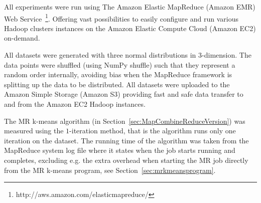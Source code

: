 All experiments were run using The Amazon Elastic MapReduce (Amazon EMR) Web Service~\footnote{http://aws.amazon.com/elasticmapreduce/}. Offering vast possibilities to easily configure and run various Hadoop clusters instances on the Amazon Elastic Compute Cloud (Amazon EC2) on-demand. 

All datasets were generated with three normal distributions in $3$-dimension. The data points were shuffled (using NumPy shuffle) such that they represent a random order internally, avoiding bias when the MapReduce framework is splitting up the data to be distributed. All datasets were uploaded to the Amazon Simple Storage (Amazon S3) providing fast and safe data transfer to and from the Amazon EC2 Hadoop instances.

The MR k-means algorithm (in Section~\ref{sec:MapCombineReduceVersion}) was measured using the $1$-iteration method, that is the algorithm runs only one iteration on the dataset. The running time of the algorithm was taken from the MapReduce system log file where it states when the job starts running and completes, excluding e.g. the extra overhead when starting the MR job directly from the MR k-means program, see Section~\ref{sec:mrkmeansprogram}.

